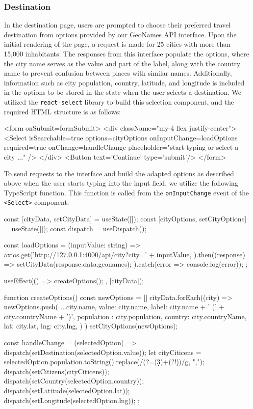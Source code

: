 \documentclass[english,notitlepage,smartquotes]{hgbreport}
\begin{document}
\subsubsection{Destination}\label{DestinationPage}

In the destination page, users are prompted to choose their preferred travel destination from options provided by our GeoNames API interface. Upon the initial rendering of the page, a request is made for 25 cities with more than 15,000 inhabitants. The responses from this interface populate the options, where the city name serves as the value and part of the label, along with the country name to prevent confusion between places with similar names. Additionally, information such as city population, country, latitude, and longitude is included in the options to be stored in the state when the user selects a destination. We utilized the \texttt{react-select} library to build this selection component, and the required HTML structure is as follows:

\begin{HtmlCode}
	<form onSubmit={formSubmit}>
		<div className="my-4 flex justify-center">
			<Select
				isSearchable={true}
				options={cityOptions}
				onInputChange={loadOptions}
				required={true}
				onChange={handleChange}
				placeholder="start typing or select a city ..."
			/>
		</div>
		<Button text='Continue' type='submit'/>
	</form>
\end{HtmlCode}

To send requests to the interface and build the adapted options as described above when the user starts typing into the input field, we utilize the following TypeScript function. This function is called from the \texttt{onInputChange} event of the \texttt{<Select>} component:

\begin{JsCode}
const [cityData, setCityData] = useState([]);
const [cityOptions, setCityOptions] = useState([]);
const dispatch = useDispatch();
	
const loadOptions = (inputValue: string) => {
	axios.get('http://127.0.0.1:4000/api/city?city=' + inputValue, {}).then((response) => {
		setCityData(response.data.geonames);
	}).catch(error => console.log(error));
};

useEffect(() => {
	createOptions();
}, [cityData]);

function createOptions() {
	const newOptions = []
	cityData.forEach((city) => {
		newOptions.push({
			...city.name,
			value: city.name,
			label: city.name + ' (' + city.countryName + ')',
			population : city.population,
			country: city.countryName,
			lat: city.lat,
			lng: city.lng,
		})
	})
	setCityOptions(newOptions);
}

const handleChange = (selectedOption) => {
	dispatch(setDestination(selectedOption.value));
	let cityCiticens = selectedOption.population.toString().replace(/\B(?=(\d{3})+(?!\d))/g, ",");
	dispatch(setCitizens(cityCiticens));
	dispatch(setCountry(selectedOption.country));
	dispatch(setLatitude(selectedOption.lat));
	dispatch(setLongitude(selectedOption.lng));
};
\end{JsCode}
\end{document}
